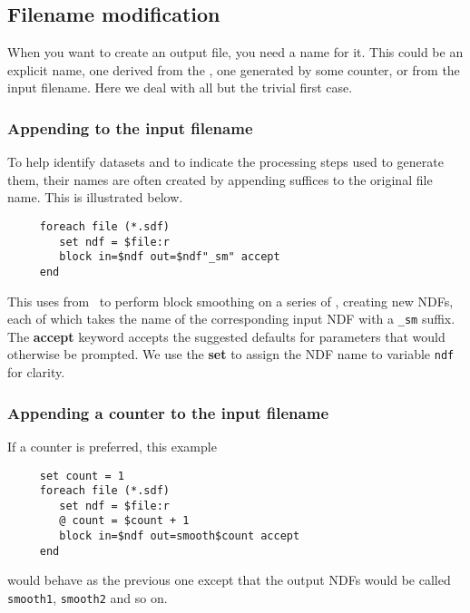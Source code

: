 \subsection{Filename modification
\label{sc4_se_filename_mod}}

 When you
want to create an output file, you need a name for it.  This could be an
explicit name, one derived from the , one
generated by some counter, or from the input filename.  Here we deal
with all but the trivial first case.

\subsubsection{Appending to the input
filename\label{sc4_se_append_filename}}

To help identify datasets and to indicate the processing steps used to
generate them, their names are often created by appending suffices to
the original file name.  This is illustrated below.

\small
\begin{verbatim}
     foreach file (*.sdf)
        set ndf = $file:r
        block in=$ndf out=$ndf"_sm" accept
     end
\end{verbatim}
\normalsize
This uses  from \KAPPAref\normalsize\ to perform
block smoothing on a series of , creating new NDFs,
each of which takes the name of the corresponding input NDF with a
{\tt \_sm} suffix.  The {\bf accept} keyword accepts the suggested
defaults for parameters that would otherwise be prompted.  We use the
{\bf set} to assign the NDF name to variable {\tt ndf} for clarity.

\subsubsection{Appending a counter to the input
filename\label{sc4_se_append_counter}}

If a counter is preferred, this example

\small
\begin{verbatim}
     set count = 1
     foreach file (*.sdf)
        set ndf = $file:r
        @ count = $count + 1
        block in=$ndf out=smooth$count accept
     end
\end{verbatim}
\normalsize
would behave as the previous one except that the output NDFs would be
called {\tt smooth1}, {\tt smooth2} and so on.

